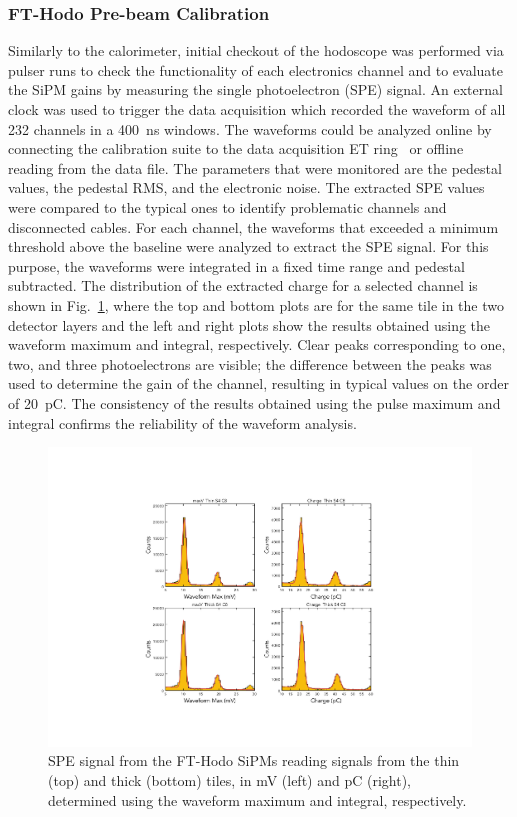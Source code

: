 \subsubsection{FT-Hodo Pre-beam Calibration}

Similarly to the calorimeter, initial checkout of the hodoscope was performed via pulser runs to check the functionality
of each electronics channel and to evaluate the SiPM gains by measuring the single photoelectron (SPE) signal. An external
clock was used to trigger the data acquisition which recorded the waveform of all 232 channels in a 400~ns windows.
The waveforms could be analyzed online by connecting the calibration suite to the data acquisition ET ring~\cite{daq}
or offline reading from the data file. The parameters that were monitored are the pedestal values, the pedestal RMS,
and the electronic noise. The extracted SPE values were compared to the typical ones to identify problematic channels
and disconnected cables. For each channel, the waveforms that exceeded a minimum threshold above the baseline were
analyzed to extract the SPE signal. For this purpose, the waveforms were integrated in a fixed time range and pedestal
subtracted. The distribution of the extracted charge for a selected channel is shown in Fig.~\ref{fig:fthodo_spe}, where
the top and bottom plots are for the same tile in the two detector layers and the left and right plots show the results
obtained using the waveform maximum and integral, respectively. Clear peaks corresponding to one, two, and three
photoelectrons are visible; the difference between the peaks was used to determine the gain of the channel, resulting in
typical values on the order of 20~pC. The consistency of the results obtained using the pulse maximum and integral
confirms the reliability of the waveform analysis.

\begin{figure}
\includegraphics[width=1.0\columnwidth]{fig/fthodo_spe_2.pdf}
\caption{SPE signal from the FT-Hodo SiPMs reading signals from the thin (top) and thick (bottom) tiles, in mV
  (left) and pC (right), determined using the waveform maximum and integral, respectively.}
\label{fig:fthodo_spe}
\end{figure}

